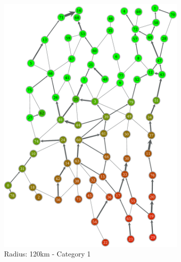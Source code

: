 \documentclass[titlepage]{article}
\begin{document}
\begin{figure}[H]
\begin{subfigure}[b]{0.3\textwidth}
        \includegraphics[width=\textwidth]{figures/right_120_1-crop.pdf}
        \caption{Radius: 120km - Category 1}
        \label{fig:pop_county39}
      \end{subfigure}~
      \begin{subfigure}[b]{0.3\textwidth}
        \center

\end{subfigure}
\end{figure}
\end{document}
